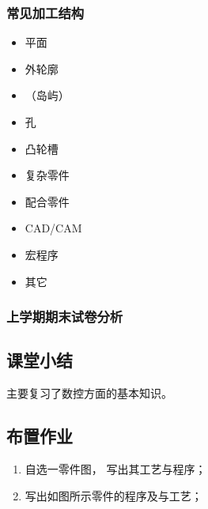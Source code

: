 \subsubsection{常见加工结构}
\begin{itemize}
	\item 平面

	\item 外轮廓

	\item （岛屿）

	\item 孔
	\item 凸轮槽

	\item 复杂零件

	\item 配合零件

	\item CAD/CAM

	\item 宏程序

	\item 其它
\end{itemize}
\subsubsection{上学期期末试卷分析}
\subsection{课堂小结}
主要复习了数控方面的基本知识。
\vfill
\subsection{布置作业}
\begin{enumerate}[1、]
	\item 自选一零件图， 写出其工艺与程序；

	\item 写出如图所示零件的程序及与工艺；
\end{enumerate}
\vfill

